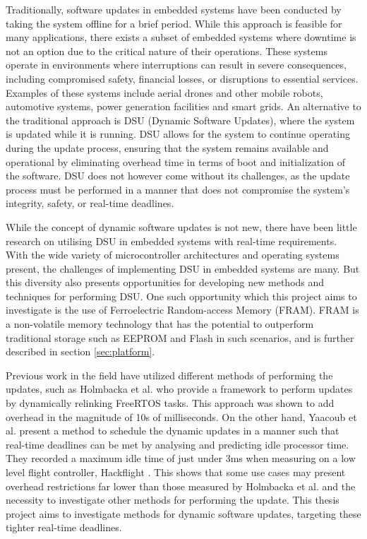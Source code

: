 Traditionally, software updates in embedded systems have been conducted by taking the system offline for a brief period. While this approach is feasible for many applications, there exists a subset of embedded systems where downtime is not an option due to the critical nature of their operations. These systems operate in environments where interruptions can result in severe consequences, including compromised safety, financial losses, or disruptions to essential services. Examples of these systems include aerial drones and other mobile robots, automotive systems, power generation facilities and smart grids. An alternative to the traditional approach is DSU (Dynamic Software Updates), where the system is updated while it is running. DSU allows for the system to continue operating during the update process, ensuring that the system remains available and operational by eliminating overhead time in terms of boot and initialization of the software. DSU does not however come without its challenges, as the update process must be performed in a manner that does not compromise the system's integrity, safety, or real-time deadlines.

While the concept of dynamic software updates is not new, there have been little research on utilising DSU in embedded systems with real-time requirements. With the wide variety of microcontroller architectures and operating systems present, the challenges of implementing DSU in embedded systems are many. But this diversity also presents opportunities for developing new methods and techniques for performing DSU. One such opportunity which this project aims to investigate is the use of Ferroelectric Random-access Memory (FRAM). FRAM is a non-volatile memory technology that has the potential to outperform traditional storage such as EEPROM and Flash in such scenarios, and is further described in section \ref{sec:platform}.

Previous work in the field have utilized different methods of performing the updates, such as Holmbacka et al. \cite{dynUpdateFramework} who provide a framework to perform updates by dynamically relinking FreeRTOS tasks. This approach was shown to add overhead in the magnitude of 10s of milliseconds. On the other hand, Yaacoub et al. \cite{NeRTA} present a method to schedule the dynamic updates in a manner such that real-time deadlines can be met by analysing and predicting idle processor time. They recorded a maximum idle time of just under 3ms when measuring on a low level flight controller, Hackflight \cite{hackflight}. This shows that some use cases may present overhead restrictions far lower than those measured by Holmbacka et al. and the necessity to investigate other methods for performing the update. This thesis project aims to investigate methods for dynamic software updates, targeting these tighter real-time deadlines. 

